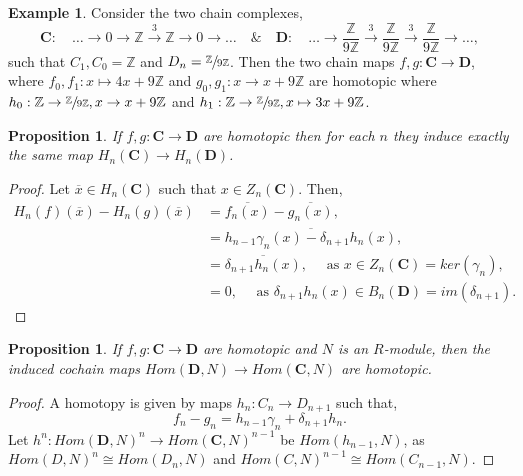 \documentclass[11.5pt, twoside, a4paper, titlepage]{report}
\providecommand{\bb}[1]{\mathbb{#1}}
\theoremstyle{definition}
\newtheorem{eg}[mydef]{Example}
\theoremstyle{plain}
\newtheorem{prop}[mydef]{Proposition}
\begin{document}
\begin{eg}
Consider the two chain complexes,
\begin{equation*}
\mathbf{C}: \quad \dots \xrightarrow{} 0 \xrightarrow{} \bb{Z} \xrightarrow{3} \bb{Z} \xrightarrow{} 0 \xrightarrow{} \dots \quad \& \quad \mathbf{D}: \quad \dots \xrightarrow{} \frac{\bb{Z}}{9\bb{Z}} \xrightarrow{3} \frac{\bb{Z}}{9\bb{Z}} \xrightarrow{3} \frac{\bb{Z}}{9\bb{Z}} \xrightarrow{} \dots,
\end{equation*}
such that $C_1,C_0=\bb{Z}$ and $D_n=\sfrac{\bb{Z}}{9\bb{Z}}$. Then the two chain maps $f, g:\mathbf{C} \to \mathbf{D}$, where $f_0, f_1: x \mapsto 4x+9\bb{Z}$ and $g_0, g_1: x \to x+9\bb{Z}$ are homotopic where $h_0: \bb{Z} \to \sfrac{\bb{Z}}{9\bb{Z}}, x \to x+9\bb{Z}$ and $h_1: \bb{Z} \to \sfrac{\bb{Z}}{9\bb{Z}}, x \mapsto 3x +9\bb{Z}$.
\end{eg}

\begin{prop} \label{homotopyhomologyprop}
If $f,g:\mathbf{C}\to \mathbf{D}$ are homotopic then for each $n$ they induce exactly the same map $H_n(\mathbf{C})\to H_n(\mathbf{D})$.
\end{prop}
\begin{proof}
Let $\overline{x} \in H_n(\mathbf{C})$ such that $x\in Z_n(\mathbf{C})$. Then,
\begin{align*}
H_n(f)(\overline{x})-H_n(g)(\overline{x})&= \overline{f_n(x)} - \overline{g_n(x)},\\
&= \overline{h_{n-1}\gamma_n(x)-\delta_{n+1}h_n(x)},\\
&=\overline{\delta_{n+1}h_n(x)}, \quad\text{ as }x\in Z_n(\mathbf{C})=ker(\gamma_n),\\
&=0, \quad \text{ as } \delta_{n+1}h_n(x)\in B_n(\mathbf{D})=im(\delta_{n+1}).
\end{align*}
\end{proof}

\begin{prop} 
If $f,g: \mathbf{C}\to \mathbf{D}$ are homotopic and $N$ is an $R$-module, then the induced cochain maps $Hom(\mathbf{D}, N) \to Hom(\mathbf{C},N)$ are homotopic.
\end{prop}
\begin{proof}
A homotopy is given by maps $h_n:C_n\to D_{n+1}$ such that, 
\begin{equation*}
f_n-g_n=h_{n-1}\gamma_n + \delta_{n+1}h_n.
\end{equation*}
Let $h^n:Hom(\mathbf{D},N)^n \to Hom(\mathbf{C}, N)^{n-1}$ be $Hom(h_{n-1}, N)$, as $Hom(D, N)^n \cong Hom(D_n, N)$ and $Hom(C, N)^{n-1} \cong Hom(C_{n-1}, N)$.
\end{proof}
\end{document}
